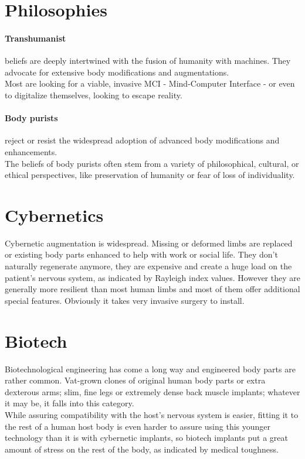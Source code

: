 \section{Philosophies}
\paragraph{Transhumanist}
beliefs are deeply intertwined with the fusion of humanity with machines.
They advocate for extensive body modifications and augmentations.\\
Most are looking for a viable, invasive MCI - Mind-Computer Interface -
	or even to digitalize themselves,
	looking to escape reality.
\paragraph{Body purists} reject or resist the widespread adoption of advanced body modifications and enhancements.\\
The beliefs of body purists often stem from a variety of philosophical, cultural, or ethical perspectives, like preservation of humanity or fear of loss of individuality.

\section{Cybernetics}
Cybernetic augmentation is widespread. Missing or deformed limbs are replaced or existing body parts enhanced to help with work or social life. They don’t naturally regenerate anymore, they are expensive and create a huge load on the patient’s nervous system, as indicated by Rayleigh index values. However they are generally more resilient than most human limbs and most of them offer additional special features. Obviously it takes very invasive surgery to install.
\section{Biotech}
Biotechnological engineering has come a long way and engineered body parts are rather common. Vat-grown clones of original human body parts or extra dexterous arms; slim, fine legs or extremely dense back muscle implants; whatever it may be, it falls into this category.\\
While assuring compatibility with the host's nervous system is easier, fitting it to the rest of a human host body is even harder to assure using this younger technology than it is with cybernetic implants, so biotech implants put a great amount of stress on the rest of the body, as indicated by medical toughness.
